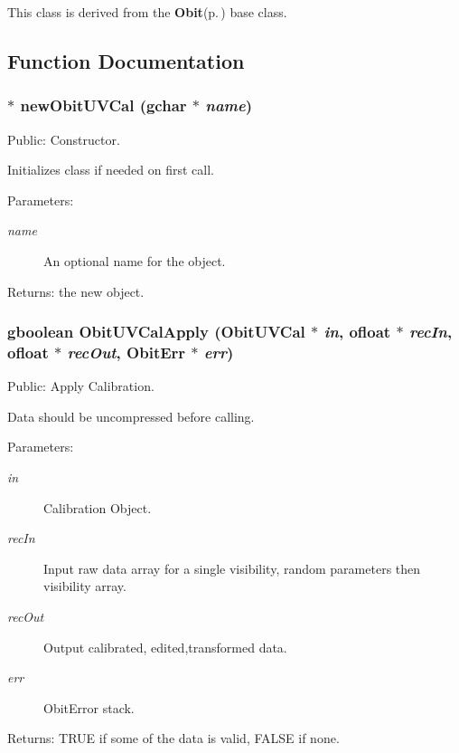 This class is derived from the {\bf Obit}{\rm (p.\,\pageref{structObit})} base class.

\subsection{Function Documentation}
\subsubsection{$\ast$ new\-Obit\-UVCal (gchar $\ast$ {\em name})}\label{ObitUVCal_8c_a8}


Public: Constructor. 

Initializes class if needed on first call. \begin{Desc}
\item[Parameters:]
\begin{description}
\item[{\em name}]An optional name for the object. \end{description}
\end{Desc}
\begin{Desc}
\item[Returns:]the new object. \end{Desc}
\subsubsection{\setlength{\rightskip}{0pt plus 5cm}gboolean Obit\-UVCal\-Apply ({\bf Obit\-UVCal} $\ast$ {\em in}, {\bf ofloat} $\ast$ {\em rec\-In}, {\bf ofloat} $\ast$ {\em rec\-Out}, {\bf Obit\-Err} $\ast$ {\em err})}\label{ObitUVCal_8c_a13}


Public: Apply Calibration. 

Data should be uncompressed before calling. \begin{Desc}
\item[Parameters:]
\begin{description}
\item[{\em in}]Calibration Object. \item[{\em rec\-In}]Input raw data array for a single visibility, random parameters then visibility array. \item[{\em rec\-Out}]Output calibrated, edited,transformed data. \item[{\em err}]Obit\-Error stack. \end{description}
\end{Desc}
\begin{Desc}
\item[Returns:]TRUE if some of the data is valid, FALSE if none. \end{Desc}
